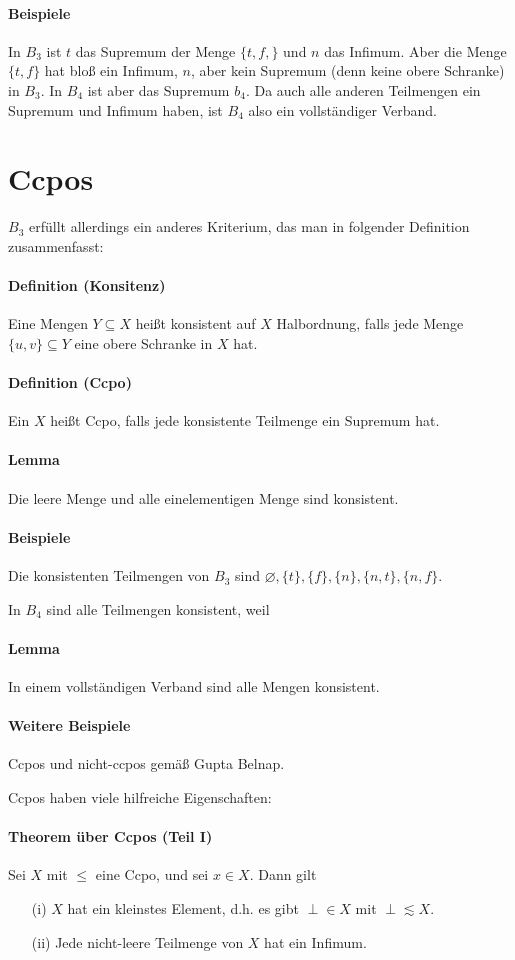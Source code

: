 \documentclass[a4paper,11pt,abstracton]{scrartcl}
\begin{document}
\paragraph{Beispiele} In $B_3$ ist $t$ das Supremum der Menge $\{t,f,\}$ und $n$ das Infimum. Aber die Menge $\{t,f\}$ hat bloß ein Infimum, $n$, aber kein Supremum (denn keine obere Schranke) in $B_3$. In $B_4$ ist aber das Supremum $b_4$. Da auch alle anderen Teilmengen ein Supremum und Infimum haben, ist $B_4$ also ein vollständiger Verband.
\section{Ccpos}
$B_3$ erfüllt allerdings ein anderes Kriterium, das man in folgender Definition zusammenfasst:
\paragraph{Definition (Konsitenz)} Eine Mengen $Y \subseteq X$ heißt konsistent auf $X$ Halbordnung, falls jede Menge $\{u,v\} \subseteq Y$ eine obere Schranke in $X$ hat.
\paragraph{Definition (Ccpo)} Ein $X$ heißt Ccpo, falls jede konsistente Teilmenge ein Supremum hat.
\paragraph{Lemma} Die leere Menge und alle einelementigen Menge sind konsistent.
\paragraph{Beispiele} Die konsistenten Teilmengen von $B_3$ sind $\varnothing, \{ t\}, \{f \}, \{n\}, \{n,t\}, \{n,f\}$.

In $B_4$ sind alle Teilmengen konsistent, weil
\paragraph{Lemma} In einem vollständigen Verband sind alle Mengen konsistent.

\paragraph{Weitere Beispiele} Ccpos und nicht-ccpos gemäß Gupta Belnap.

Ccpos haben viele hilfreiche Eigenschaften:
\paragraph{Theorem über Ccpos (Teil I)} Sei $X$ mit $\leq$ eine Ccpo, und sei $x \in X$. Dann gilt
\begin{enumerate}
 \item[(i)] $X$ hat ein kleinstes Element, d.h. es gibt $\perp \in X$ mit $\perp \lesssim X$.
 \item[(ii)] Jede nicht-leere Teilmenge von $X$ hat ein Infimum.
\end{enumerate}
\end{document}
